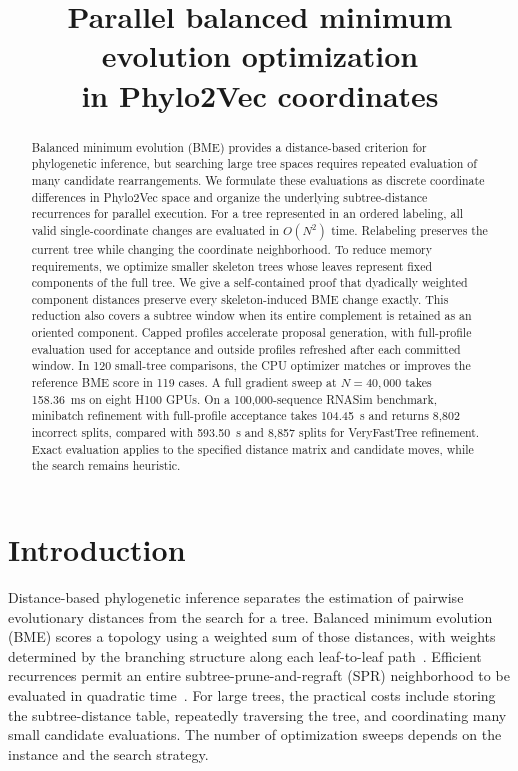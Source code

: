 \documentclass[11pt,a4paper]{article}
\title{Parallel balanced minimum evolution optimization\\in Phylo2Vec coordinates}
\author{}
\date{}
\makeatletter
\DeclareRobustCommand{\_}{\ifmmode\nfss@text{\textunderscore}\else\textunderscore\allowbreak\fi}
\theoremstyle{definition}
\makeatother
\begin{document}
\maketitle

\begin{abstract}
Balanced minimum evolution (BME) provides a distance-based criterion for phylogenetic inference, but searching large tree spaces requires repeated evaluation of many candidate rearrangements.
We formulate these evaluations as discrete coordinate differences in Phylo2Vec space and organize the underlying subtree-distance recurrences for parallel execution.
For a tree represented in an ordered labeling, all valid single-coordinate changes are evaluated in $O(N^2)$ time.
Relabeling preserves the current tree while changing the coordinate neighborhood.
To reduce memory requirements, we optimize smaller skeleton trees whose leaves represent fixed components of the full tree.
We give a self-contained proof that dyadically weighted component distances preserve every skeleton-induced BME change exactly.
This reduction also covers a subtree window when its entire complement is retained as an oriented component.
Capped profiles accelerate proposal generation, with full-profile evaluation used for acceptance and outside profiles refreshed after each committed window.
In 120 small-tree comparisons, the CPU optimizer matches or improves the reference BME score in 119 cases.
A full gradient sweep at $N=40{,}000$ takes 158.36~ms on eight H100 GPUs.
On a 100,000-sequence RNASim benchmark, minibatch refinement with full-profile acceptance takes 104.45~s and returns 8,802 incorrect splits, compared with 593.50~s and 8,857 splits for VeryFastTree refinement.
Exact evaluation applies to the specified distance matrix and candidate moves, while the search remains heuristic.
\end{abstract}

\section{Introduction}
\label{sec:introduction}

Distance-based phylogenetic inference separates the estimation of pairwise evolutionary distances from the search for a tree.
Balanced minimum evolution (BME) scores a topology using a weighted sum of those distances, with weights determined by the branching structure along each leaf-to-leaf path~\cite{pauplin2000direct,desper2002fast,desper2004theory}.
Efficient recurrences permit an entire subtree-prune-and-regraft (SPR) neighborhood to be evaluated in quadratic time~\cite{hordijk2005spr,lefort2015fastme}.
For large trees, the practical costs include storing the subtree-distance table, repeatedly traversing the tree, and coordinating many small candidate evaluations.
The number of optimization sweeps depends on the instance and the search strategy.
\end{document}
